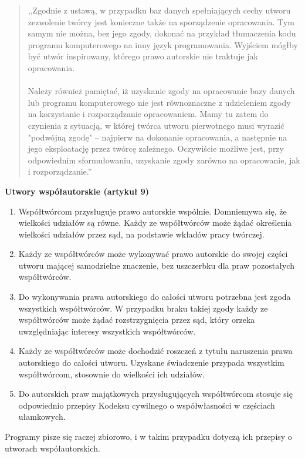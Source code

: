 \documentclass[12pt,a4paper]{article}
\begin{document}
\begin{quote}
,,Zgodnie z ustawą, w przypadku baz danych spełniających cechy utworu zezwolenie twórcy jest konieczne także na sporządzenie opracowania. Tym samym nie można, bez jego zgody, dokonać na przykład tłumaczenia kodu programu komputerowego na inny język programowania. Wyjściem mógłby być utwór inspirowany, którego prawo autorskie nie traktuje jak opracowania.
\paragraph{}
Należy również pamiętać, iż uzyskanie zgody na opracowanie bazy danych lub programu komputerowego nie jest równoznaczne z udzieleniem zgody na korzystanie i rozporządzanie opracowaniem. Mamy tu zatem do czynienia z sytuacją, w której twórca utworu pierwotnego musi wyrazić "podwójną zgodę" – najpierw na dokonanie opracowania, a następnie na jego eksploatację przez twórcę zależnego. Oczywiście możliwe jest, przy odpowiednim sformułowaniu, uzyskanie zgody zarówno na opracowanie, jak i rozporządzanie.''
\end{quote}
\textbf{Utwory współautorskie (artykuł 9)}
\begin{enumerate}
\item Współtwórcom przysługuje prawo autorskie wspólnie. Domniemywa się, że wielkości udziałów są równe. Każdy ze współtwórców może żądać określenia wielkości udziałów przez sąd, na podstawie wkładów pracy twórczej.
\item Każdy ze współtwórców może wykonywać prawo autorskie do swojej części utworu mającej samodzielne znaczenie, bez uszczerbku dla praw pozostałych współtwórców.
\item Do wykonywania prawa autorskiego do całości utworu potrzebna jest zgoda wszystkich współtwórców. W przypadku braku takiej zgody każdy ze współtwórców może żądać rozstrzygnięcia przez sąd, który orzeka uwzględniając interesy wszystkich współtwórców.
\item Każdy ze współtwórców może dochodzić roszczeń z tytułu naruszenia prawa autorskiego do całości utworu. Uzyskane świadczenie przypada wszystkim współtwórcom, stosownie do wielkości ich udziałów.
\item Do autorskich praw majątkowych przysługujących współtwórcom stosuje się odpowiednio przepisy Kodeksu cywilnego o współwłasności w częściach ułamkowych.
\end{enumerate}
Programy pisze się raczej zbiorowo, i w takim przypadku dotyczą ich przepisy o utworach współautorskich.
\end{document}
